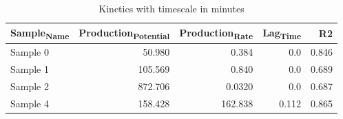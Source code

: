 \documentclass[11pt]{article}
\begin{document}
\begin{table}[htbp]
\caption{Kinetics with timescale in minutes}
\centering
\begin{tabular}{lrrrr}
Sample\textsubscript{Name} & Production\textsubscript{Potential} & Production\textsubscript{Rate} & Lag\textsubscript{Time} & R2\\[0pt]
\hline
Sample 0 & 50.980 & 0.384 & 0.0 & 0.846\\[0pt]
Sample 1 & 105.569 & 0.840 & 0.0 & 0.689\\[0pt]
Sample 2 & 872.706 & 0.0320 & 0.0 & 0.687\\[0pt]
Sample 4 & 158.428 & 162.838 & 0.112 & 0.865\\[0pt]
\end{tabular}
\end{table}
\end{document}
